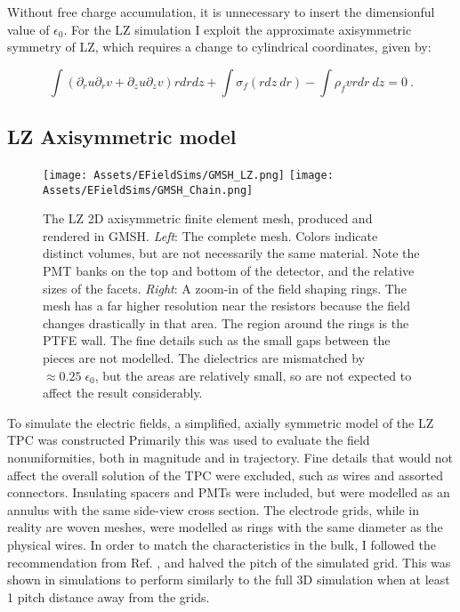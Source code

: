 Without free charge accumulation, it is unnecessary to insert the dimensionful value of $\epsilon_0$.
For the LZ simulation I exploit the approximate axisymmetric symmetry of LZ, which requires a change to cylindrical coordinates, given by:

\begin{equation}
    \int (\partial_r u \partial_r v + \partial_z u \partial_z v) r dr d z +
    \int \sigma_f (r dz~dr)
    - \int \rho_f v r dr~dz=0~.
    \label{eq:axi_diff_form}
\end{equation}

\subsection{LZ Axisymmetric model}
\begin{figure}
    \centering
    \texttt{[image: Assets/EFieldSims/GMSH\_LZ.png]}
  \texttt{[image: Assets/EFieldSims/GMSH\_Chain.png]}
   
    \caption[The LZ 2D axisymmetric finite element mesh, produced and rendered in GMSH.]%
    {The LZ 2D axisymmetric finite element mesh, produced and rendered in GMSH.
    \textit{Left}: The complete mesh. Colors indicate distinct volumes, but are not necessarily the same material.
    Note the PMT banks on the top and bottom of the detector, and the relative sizes of the facets.
    \textit{Right}: A zoom-in of the field shaping rings. The mesh has a far higher resolution near the resistors because the field changes drastically in that area. 
    The region around the rings is the PTFE wall. The fine details such as the small gaps between the pieces are not modelled.
    The dielectrics are mismatched by $\approx 0.25\;\epsilon_0$, but the areas are relatively small, so are not expected to affect the result considerably.}
    \label{fig:gmsh_lz}
\end{figure}

To simulate the electric fields, a simplified, axially symmetric model of the LZ TPC was constructed 
Primarily this was used to evaluate the field nonuniformities, both in magnitude and in trajectory.
Fine details that would not affect the overall solution of the TPC were excluded, such as wires and assorted connectors.
Insulating spacers and PMTs were included, but  were modelled as an annulus with the same side-view cross section.
The electrode grids, while in reality are woven meshes, were modelled as rings with the same diameter as the physical wires.
In order to match the characteristics in the bulk, I followed the recommendation from Ref. \cite{bevilacqua_procedure_2015}, and halved the pitch of the simulated grid. 
This was shown in simulations to perform similarly to the full 3D simulation when at least 1 pitch distance away from the grids.

